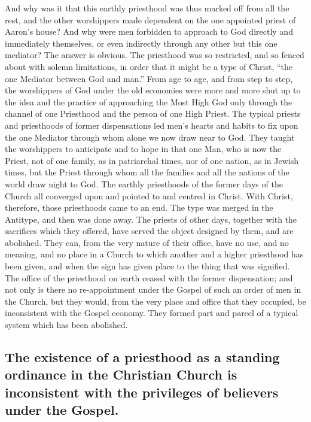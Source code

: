 \documentclass[]{book}
\begin{document}
And why was it that this earthly priesthood was thus marked off from all the rest, and the other worshippers made dependent on the one appointed priest of Aaron's house? And why were men forbidden to approach to God directly and immediately themselves, or even indirectly through any other but this one mediator? The answer is obvious. The priesthood was so restricted, and so fenced about with solemn limitations, in order that it might be a type of Christ, ``the one Mediator between God and man.'' From age to age, and from step to step, the worshippers of God under the old economies were more and more shut up to the idea and the practice of approaching the Most High God only through the channel of one Priesthood and the person of one High Priest. The typical priests and priesthoods of former dispensations led men's hearts and habits to fix upon the one Mediator through whom alone we now draw near to God. They taught the worshippers to anticipate and to hope in that one Man, who is now the Priest, not of one family, as in patriarchal times, nor of one nation, as in Jewish times, but the Priest through whom all the families and all the nations of the world draw night to God. The earthly priesthoods of the former days of the Church all converged upon and pointed to and centred in Christ. With Christ, therefore, those priesthoods came to an end. The type was merged in the Antitype, and then was done away. The priests of other days, together with the sacrifices which they offered, have served the object designed by them, and are abolished. They can, from the very nature of their office, have no use, and no meaning, and no place in a Church to which another and a higher priesthood has been given, and when the sign has given place to the thing that was signified. The office of the priesthood on earth ceased with the former dispensation; and not only is there no re-appointment under the Gospel of such an order of men in the Church, but they would, from the very place and office that they occupied, be inconsistent with the Gospel economy. They formed part and parcel of a typical system which has been abolished.

\hypertarget{the-existence-of-a-priesthood-as-a-standing-ordinance-in-the-christian-church-is-inconsistent-with-the-privileges-of-believers-under-the-gospel.}{%
\subsection{The existence of a priesthood as a standing ordinance in the Christian Church is inconsistent with the privileges of believers under the Gospel.}\label{the-existence-of-a-priesthood-as-a-standing-ordinance-in-the-christian-church-is-inconsistent-with-the-privileges-of-believers-under-the-gospel.}}
\end{document}
